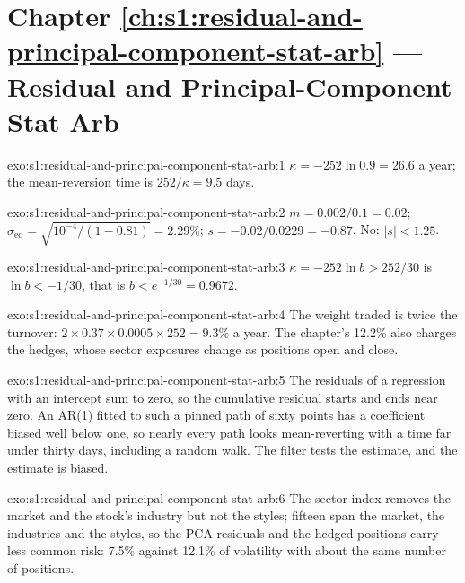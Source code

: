 \section*{Chapter \ref{ch:s1:residual-and-principal-component-stat-arb} --- Residual and Principal-Component Stat Arb}

\begin{solution}{exo:s1:residual-and-principal-component-stat-arb:1}
$\kappa = -252 \ln 0.9 = 26.6$ a year; the mean-reversion time is $252/\kappa = 9.5$ days.
\end{solution}

\begin{solution}{exo:s1:residual-and-principal-component-stat-arb:2}
$m = 0.002/0.1 = 0.02$; $\sigma_{\mathrm{eq}} = \sqrt{10^{-4}/(1 - 0.81)} = 2.29\%$; $s = -0.02/0.0229 = -0.87$. No: $|s| < 1.25$.
\end{solution}

\begin{solution}{exo:s1:residual-and-principal-component-stat-arb:3}
$\kappa = -252 \ln b > 252/30$ is $\ln b < -1/30$, that is $b < e^{-1/30} = 0.9672$.
\end{solution}

\begin{solution}{exo:s1:residual-and-principal-component-stat-arb:4}
The weight traded is twice the turnover: $2 \times 0.37 \times 0.0005 \times 252 = 9.3\%$ a year. The chapter's 12.2\% also charges the hedges, whose sector
exposures change as positions open and close.
\end{solution}

\begin{solution}{exo:s1:residual-and-principal-component-stat-arb:5}
The residuals of a regression with an intercept sum to zero, so the cumulative residual starts and ends near zero. An AR(1) fitted to such a pinned path of
sixty points has a coefficient biased well below one, so nearly every path looks mean-reverting with a time far under thirty days, including a random walk.
The filter tests the estimate, and the estimate is biased.
\end{solution}

\begin{solution}{exo:s1:residual-and-principal-component-stat-arb:6}
The sector index removes the market and the stock's industry but not the styles; fifteen  span the market, the industries and the styles, so
the PCA residuals and the hedged positions carry less common risk: 7.5\% against 12.1\% of volatility with about the same number of positions.
\end{solution}

